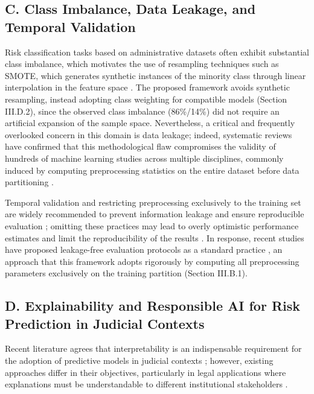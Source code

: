 \documentclass[
  number]{elsarticle}
\begin{document}
\subsection{C. Class Imbalance, Data Leakage, and Temporal
Validation}\label{c.-class-imbalance-data-leakage-and-temporal-validation}

Risk classification tasks based on administrative datasets often exhibit
substantial class imbalance, which motivates the use of resampling
techniques such as SMOTE, which generates synthetic instances of the
minority class through linear interpolation in the feature space
\citep{chawla_smote_2002}. The proposed framework avoids synthetic
resampling, instead adopting class weighting for compatible models
(Section III.D.2), since the observed class imbalance (86\%/14\%) did
not require an artificial expansion of the sample space. Nevertheless, a
critical and frequently overlooked concern in this domain is data
leakage; indeed, systematic reviews have confirmed that this
methodological flaw compromises the validity of hundreds of machine
learning studies across multiple disciplines, commonly induced by
computing preprocessing statistics on the entire dataset before data
partitioning \citep{kapoor_leakage_2023}.

Temporal validation and restricting preprocessing exclusively to the
training set are widely recommended to prevent information leakage and
ensure reproducible evaluation
\citep{kapoor_leakage_2023, sasse_leakage_2023}; omitting these
practices may lead to overly optimistic performance estimates and limit
the reproducibility of the results \citep{hamdan_julearn_2023}. In
response, recent studies have proposed leakage-free evaluation protocols
as a standard practice \citep{hamdan_julearn_2023}, an approach that
this framework adopts rigorously by computing all preprocessing
parameters exclusively on the training partition (Section III.B.1).

\subsection{D. Explainability and Responsible AI for Risk Prediction in
Judicial
Contexts}\label{d.-explainability-and-responsible-ai-for-risk-prediction-in-judicial-contexts}

Recent literature agrees that interpretability is an indispensable
requirement for the adoption of predictive models in judicial contexts
\citep{richmond_explainable_2024}; however, existing approaches differ
in their objectives, particularly in legal applications where
explanations must be understandable to different institutional
stakeholders \citep{richmond_explainable_2024}.
\end{document}
